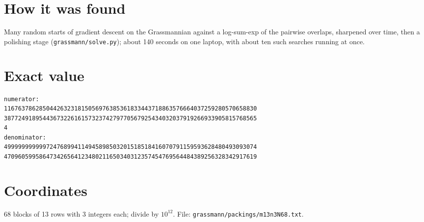 \documentclass[11pt,a4paper]{article}
\begin{document}
\section{How it was found}
Many random starts of gradient descent on the Grassmannian against a log-sum-exp of the pairwise overlaps, sharpened over time, then a polishing stage (\texttt{grassmann/solve.py}); about 140 seconds on one laptop, with about ten such searches running at once.


\appendix
\section{Exact value}
{\small
\begin{verbatim}
numerator:
116763786285044263231815056976385361833443718863576664037259280570658830
387724918954436732261615732374279770567925434032037919266933905815768565
4
denominator:
499999999999724768994114945898503201518518416070791159593628480493093074
470960599586473426564123480211650340312357454769564484389256328342917619
\end{verbatim}}

\section{Coordinates}
68 blocks of 13 rows with 3 integers each; divide by $10^{12}$. File: \texttt{grassmann/packings/m13n3N68.txt}.
{\tiny
\begin{multicols}{3}
\end{multicols}}
\end{document}
